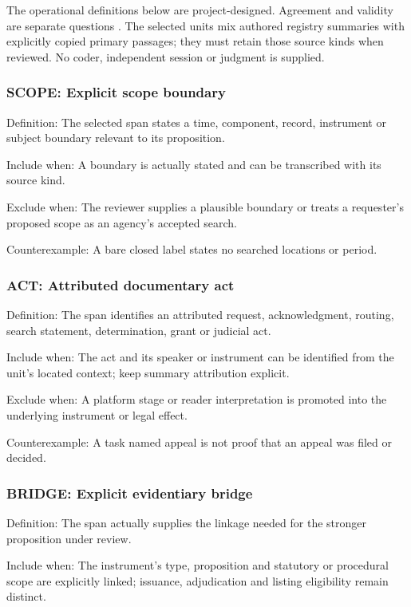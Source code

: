 \documentclass[
  english,
]{article}
\begin{document}
The operational definitions below are project-designed. Agreement and
validity are separate questions \citep{artstein2008}. The selected units
mix authored registry summaries with explicitly copied primary passages;
they must retain those source kinds when reviewed. No coder, independent
session or judgment is supplied.

\subsubsection{SCOPE: Explicit scope
boundary}\label{scope-explicit-scope-boundary}

Definition: The selected span states a time, component, record,
instrument or subject boundary relevant to its proposition.

Include when: A boundary is actually stated and can be transcribed with
its source kind.

Exclude when: The reviewer supplies a plausible boundary or treats a
requester's proposed scope as an agency's accepted search.

Counterexample: A bare closed label states no searched locations or
period.

\subsubsection{ACT: Attributed documentary
act}\label{act-attributed-documentary-act}

Definition: The span identifies an attributed request, acknowledgment,
routing, search statement, determination, grant or judicial act.

Include when: The act and its speaker or instrument can be identified
from the unit's located context; keep summary attribution explicit.

Exclude when: A platform stage or reader interpretation is promoted into
the underlying instrument or legal effect.

Counterexample: A task named appeal is not proof that an appeal was
filed or decided.

\subsubsection{BRIDGE: Explicit evidentiary
bridge}\label{bridge-explicit-evidentiary-bridge}

Definition: The span actually supplies the linkage needed for the
stronger proposition under review.

Include when: The instrument's type, proposition and statutory or
procedural scope are explicitly linked; issuance, adjudication and
listing eligibility remain distinct.
\end{document}
